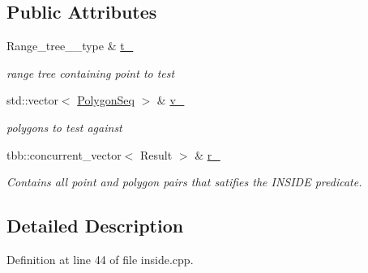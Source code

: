 \subsection*{Public Attributes}
\begin{DoxyCompactItemize}
\item 
\hypertarget{structSigSpatial2013_1_1pip_a3d863aeb56cae4b40fcae0a938a7eda5}{Range\-\_\-tree\-\_\-\_\-type \& \hyperlink{structSigSpatial2013_1_1pip_a3d863aeb56cae4b40fcae0a938a7eda5}{t\-\_\-}}\label{structSigSpatial2013_1_1pip_a3d863aeb56cae4b40fcae0a938a7eda5}

\begin{DoxyCompactList}\small\item\em range tree containing point to test \end{DoxyCompactList}\item 
\hypertarget{structSigSpatial2013_1_1pip_a847b2c5a84dd615e9ee3d8cd24766dc8}{std\-::vector$<$ \hyperlink{structSigSpatial2013_1_1PolygonSeq}{Polygon\-Seq} $>$ \& \hyperlink{structSigSpatial2013_1_1pip_a847b2c5a84dd615e9ee3d8cd24766dc8}{v\-\_\-}}\label{structSigSpatial2013_1_1pip_a847b2c5a84dd615e9ee3d8cd24766dc8}

\begin{DoxyCompactList}\small\item\em polygons to test against \end{DoxyCompactList}\item 
\hypertarget{structSigSpatial2013_1_1pip_a9621d020ff65f6310aae5cd68929e3c1}{tbb\-::concurrent\-\_\-vector$<$ Result $>$ \& \hyperlink{structSigSpatial2013_1_1pip_a9621d020ff65f6310aae5cd68929e3c1}{r\-\_\-}}\label{structSigSpatial2013_1_1pip_a9621d020ff65f6310aae5cd68929e3c1}

\begin{DoxyCompactList}\small\item\em Contains all point and polygon pairs that satifies the I\-N\-S\-I\-D\-E predicate. \end{DoxyCompactList}\end{DoxyCompactItemize}


\subsection{Detailed Description}


Definition at line 44 of file inside.\-cpp.




